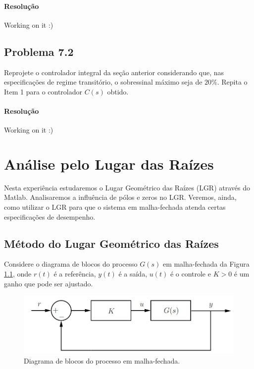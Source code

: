 \documentclass[
]{book}
\theoremstyle{definition}
\theoremstyle{definition}
\theoremstyle{definition}
\theoremstyle{remark}
\begin{document}
\hypertarget{resoluuxe7uxe3o}{%
\subsubsection*{Resolução}\label{resoluuxe7uxe3o}}

Working on it :)

\hypertarget{problema-7.2}{%
\section*{Problema 7.2}\label{problema-7.2}}

Reprojete o controlador integral da seção anterior considerando que, nas especificações de regime transitório, o sobressinal máximo seja de \(20\%\). Repita o Item 1 para o controlador \(C(s)\) obtido.

\hypertarget{resoluuxe7uxe3o-1}{%
\subsubsection*{Resolução}\label{resoluuxe7uxe3o-1}}

Working on it :)

\hypertarget{lab8}{%
\chapter{Análise pelo Lugar das Raízes}\label{lab8}}

Nesta experiência estudaremos o Lugar Geométrico das Raízes (LGR) através do Matlab. Analisaremos a influência de pólos e zeros no LGR. Veremos, ainda, como utilizar o LGR para que o sistema em malha-fechada atenda certas especificações de desempenho.

\hypertarget{muxe9todo-do-lugar-geomuxe9trico-das-rauxedzes}{%
\section{Método do Lugar Geométrico das Raízes}\label{muxe9todo-do-lugar-geomuxe9trico-das-rauxedzes}}

Considere o diagrama de blocos do processo \(G(s)\) em malha-fechada da Figura \ref{fig:fig81}, onde \(r(t)\) é a referência, \(y(t)\) é a saída, \(u(t)\) é o controle e \(K>0\) é um ganho que pode ser ajustado.

\begin{figure}

{\centering \includegraphics[width=0.5\linewidth]{Imagens/Lab8/Apresentação/fig1} 

}

\caption{Diagrama de blocos do processo em malha-fechada.}\label{fig:fig81}
\end{figure}
\end{document}
